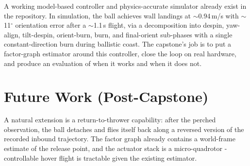 \documentclass[11pt]{article}
\begin{document}
A working model-based controller and physics-accurate simulator already
exist in the repository. In simulation, the ball achieves wall landings
at $\sim$0.94\,m/s with $\sim$11$^{\circ}$ orientation error after a
$\sim$1.1\,s flight, via a decomposition into despin, yaw-align,
tilt-despin, orient-burn, burn, and final-orient sub-phases with a
single constant-direction burn during ballistic coast. The capstone's
job is to put a factor-graph estimator around this controller, close
the loop on real hardware, and produce an evaluation of when it
works and when it does not.

\section*{Future Work (Post-Capstone)}

A natural extension is a return-to-thrower capability: after the
perched observation, the ball detaches and flies itself back along a
reversed version of the recorded inbound trajectory. The factor graph
already contains a world-frame estimate of the release point, and the
actuator stack is a micro-quadrotor - controllable hover flight is
tractable given the existing estimator.
\end{document}
